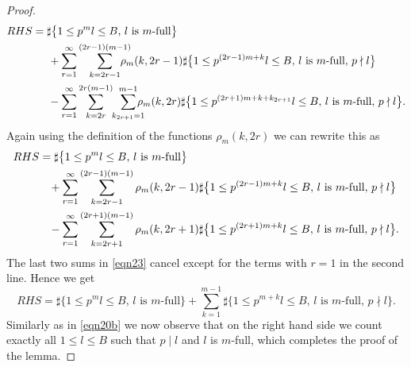 \begin{proof}
\begin{equation*}
\begin{split}
RHS = \sharp&\bigl\{1\leq p^ml\leq B,\, l \mbox{ is $m$-full}\bigr\} \\
&\hspace*{-1mm}+ \sum_{r=1}^\infty\sum_{k=2r-1}^{(2r-1)(m-1)}\hspace*{-4mm}\rho_m(k,2r-1)\sharp\bigl\{1\leq p^{(2r-1)m+k}l\leq B,\, l \mbox{ is $m$-full},\, p\nmid l\bigr\}\\
&\hspace*{-1mm}-\sum_{r=1}^\infty\sum_{k=2r}^{2r(m-1)}\hspace*{-1mm}\sum_{k_{2r+1}=1}^{m-1}\hspace*{-3mm}\rho_m(k,2r)\sharp\bigl\{1\leq p^{(2r+1)m+k+k_{2r+1}}l\leq B,\, l \mbox{ is $m$-full},\, p\nmid l\bigr\}.
\end{split}
\end{equation*}
Again using the definition of the functions $\rho_m(k,2r)$ we can rewrite this as
\begin{align}\label{eqn23}
RHS &= \sharp\bigl\{1\leq p^ml\leq B,\, l \mbox{ is $m$-full}\bigr\} \notag\\
&\hspace*{3mm}+ \sum_{r=1}^\infty\sum_{k=2r-1}^{(2r-1)(m-1)}\rho_m(k,2r-1)\sharp\bigl\{1\leq p^{(2r-1)m+k}l\leq B,\, l \mbox{ is $m$-full},\, p\nmid l\bigr\}\\
&\hspace*{3mm}-\sum_{r=1}^\infty\sum_{k=2r+1}^{(2r+1)(m-1)}\rho_m(k,2r+1)\sharp\bigl\{1\leq p^{(2r+1)m+k}l\leq B,\, l \mbox{ is $m$-full},\, p\nmid l\bigr\}.\notag
\end{align}
The last two sums in \eqref{eqn23} cancel except for the terms with $r=1$ in the second line. Hence we get
\begin{equation*}
RHS =\sharp\bigl\{1\leq p^ml\leq B,\, l \mbox{ is $m$-full}\bigr\} + \sum_{k=1}^{m-1}\sharp\bigl\{1\leq p^{m+k}l\leq B,\, l \mbox{ is $m$-full},\, p\nmid l\bigr\}.
\end{equation*}
Similarly as in \eqref{eqn20b} we now observe that on the right hand side we count exactly all $1\leq l\leq B$ such that $p\mid l$ and $l$ is $m$-full, which completes the proof of the lemma.
\end{proof}

